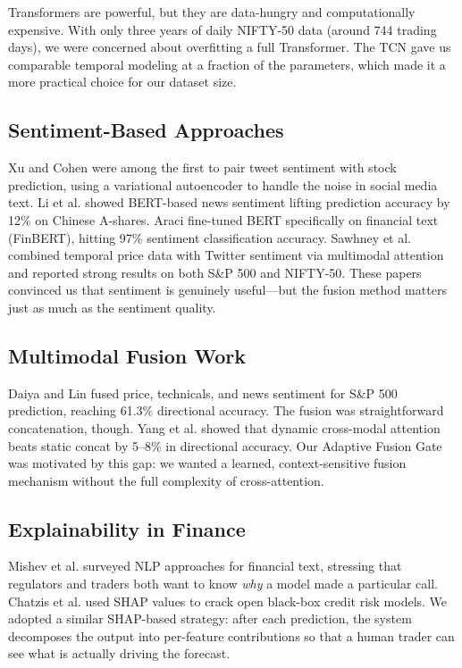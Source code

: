\documentclass[conference]{IEEEtran}
\begin{document}
Transformers are powerful, but they are data-hungry and computationally expensive. With only three years of daily NIFTY-50 data (around 744 trading days), we were concerned about overfitting a full Transformer. The TCN gave us comparable temporal modeling at a fraction of the parameters, which made it a more practical choice for our dataset size.

\subsection{Sentiment-Based Approaches}
Xu and Cohen \cite{xu2018} were among the first to pair tweet sentiment with stock prediction, using a variational autoencoder to handle the noise in social media text. Li et al. \cite{li2020sentiment} showed BERT-based news sentiment lifting prediction accuracy by 12\% on Chinese A-shares. Araci \cite{araci2019} fine-tuned BERT specifically on financial text (FinBERT), hitting 97\% sentiment classification accuracy. Sawhney et al. \cite{sawhney2021} combined temporal price data with Twitter sentiment via multimodal attention and reported strong results on both S\&P 500 and NIFTY-50. These papers convinced us that sentiment is genuinely useful---but the fusion method matters just as much as the sentiment quality.

\subsection{Multimodal Fusion Work}
Daiya and Lin \cite{daiya2021} fused price, technicals, and news sentiment for S\&P 500 prediction, reaching 61.3\% directional accuracy. The fusion was straightforward concatenation, though. Yang et al. \cite{yang2023multimodal} showed that dynamic cross-modal attention beats static concat by 5--8\% in directional accuracy. Our Adaptive Fusion Gate was motivated by this gap: we wanted a learned, context-sensitive fusion mechanism without the full complexity of cross-attention.

\subsection{Explainability in Finance}
Mishev et al. \cite{mishev2020} surveyed NLP approaches for financial text, stressing that regulators and traders both want to know \emph{why} a model made a particular call. Chatzis et al. \cite{chatzis2018} used SHAP values to crack open black-box credit risk models. We adopted a similar SHAP-based strategy: after each prediction, the system decomposes the output into per-feature contributions so that a human trader can see what is actually driving the forecast.
\end{document}
